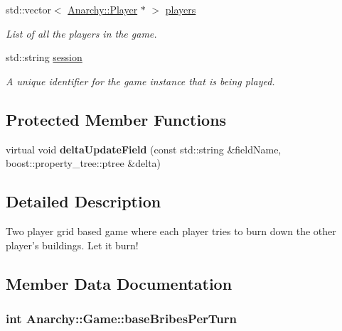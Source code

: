 \begin{DoxyCompactItemize}
std\-::vector$<$ \hyperlink{classAnarchy_1_1Player}{Anarchy\-::\-Player} $\ast$ $>$ \hyperlink{classAnarchy_1_1Game_a7320fea6bc1ac442a31ec2b96dd9eee8}{players}
\begin{DoxyCompactList}\small\item\em List of all the players in the game. \end{DoxyCompactList}\item 
std\-::string \hyperlink{classAnarchy_1_1Game_a575c3471b0f8813e00559d0f85d37cf1}{session}
\begin{DoxyCompactList}\small\item\em A unique identifier for the game instance that is being played. \end{DoxyCompactList}\end{DoxyCompactItemize}
\subsection*{Protected Member Functions}
\begin{DoxyCompactItemize}
\item 
\hypertarget{classAnarchy_1_1Game_a10996ad01e194463698355ec39a4328e}{virtual void {\bfseries delta\-Update\-Field} (const std\-::string \&field\-Name, boost\-::property\-\_\-tree\-::ptree \&delta)}\label{classAnarchy_1_1Game_a10996ad01e194463698355ec39a4328e}

\end{DoxyCompactItemize}


\subsection{Detailed Description}
Two player grid based game where each player tries to burn down the other player's buildings. Let it burn! 



\subsection{Member Data Documentation}
\hypertarget{classAnarchy_1_1Game_a32c7550663b124a3c3f9f854d0ed0a72}{
\subsubsection[{base\-Bribes\-Per\-Turn}]{\setlength{\rightskip}{0pt plus 5cm}int Anarchy\-::\-Game\-::base\-Bribes\-Per\-Turn}}\label{classAnarchy_1_1Game_a32c7550663b124a3c3f9f854d0ed0a72}


